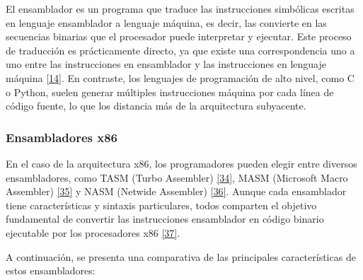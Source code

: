 \documentclass[12pt,oneside]{templates/unerthesis}
\begin{document}
El ensamblador es un programa que traduce las instrucciones simbólicas escritas en lenguaje ensamblador a lenguaje máquina, es decir, las convierte en las secuencias binarias que el procesador puede interpretar y ejecutar. Este proceso de traducción es prácticamente directo, ya que existe una correspondencia uno a uno entre las instrucciones en ensamblador y las instrucciones en lenguaje máquina \protect\hyperlink{ref-stallings_computer_2013}{{[}14{]}}. En contraste, los lenguajes de programación de alto nivel, como C o Python, suelen generar múltiples instrucciones máquina por cada línea de código fuente, lo que los distancia más de la arquitectura subyacente.

\hypertarget{ensambladores-x86}{%
\subsubsection{Ensambladores x86}\label{ensambladores-x86}}

En el caso de la arquitectura x86, los programadores pueden elegir entre diversos ensambladores, como TASM (Turbo Assembler) \protect\hyperlink{ref-tasm}{{[}34{]}}, MASM (Microsoft Macro Assembler) \protect\hyperlink{ref-masm}{{[}35{]}} y NASM (Netwide Assembler) \protect\hyperlink{ref-nasm}{{[}36{]}}. Aunque cada ensamblador tiene características y sintaxis particulares, todos comparten el objetivo fundamental de convertir las instrucciones ensamblador en código binario ejecutable por los procesadores x86 \protect\hyperlink{ref-hyde2010art}{{[}37{]}}.

A continuación, se presenta una comparativa de las principales características de estos ensambladores:
\end{document}
